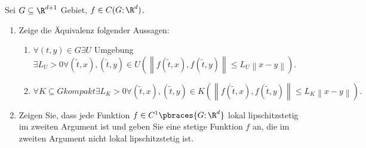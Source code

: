 \begin{exercise}
  Sei $G \subseteq \R^{d+1}$ Gebiet, $f \in C(G; \R^d)$.

  \begin{enumerate}[label = \alph*)]
    \item Zeige die Äquivalenz folgender Aussagen:
    \begin{enumerate}[label = (\arabic*)]
      \item $\forall (t, y) \in G \exists U$ Umgebung $\exists L_U > 0 \forall (\tilde{t}, x), (\tilde{t}, y) \in U
      (\left\lVert f(\tilde{t}, x), f(\tilde{t}, y) \right\rVert \leq L_U \left\lVert x-y \right\rVert).$ \label{one}

      \item $\forall K \subseteq G kompakt \exists L_K > 0 \forall (\tilde{t}, x), (\tilde{t}, y) \in K
      (\left\lVert f(\tilde{t}, x), f(\tilde{t}, y) \right\rVert \leq L_K \left\lVert x-y \right\rVert).$ \label{two}
    \end{enumerate}

    \item Zeigen Sie, dass jede Funktion $f \in C^1\pbraces{G; \R^d}$ lokal lipschitzstetig im zweiten Argument ist und geben Sie eine stetige Funktion $f$ an, die im zweiten Argument nicht lokal lipschitzstetig ist. 
  \end{enumerate}

\end{exercise}

